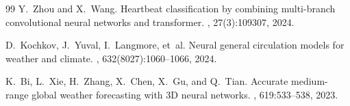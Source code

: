 \begin{thebibliography}{99}
Y.~Zhou and X.~Wang.
\newblock Heartbeat classification by combining multi-branch convolutional
  neural networks and transformer.
, 27(3):109307, 2024.





D.~Kochkov, J.~Yuval, I.~Langmore, et~al.
\newblock Neural general circulation models for weather and climate.
, 632(8027):1060--1066, 2024.

K.~Bi, L.~Xie, H.~Zhang, X.~Chen, X.~Gu, and Q.~Tian.
\newblock Accurate medium-range global weather forecasting with {3D} neural
  networks.
, 619:533--538, 2023.

\end{thebibliography}


